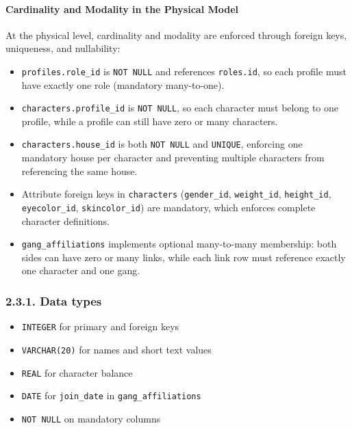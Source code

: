 \hypertarget{cardinality-and-modality-in-the-physical-model}{%
\paragraph{Cardinality and Modality in the Physical
Model}\label{cardinality-and-modality-in-the-physical-model}}

At the physical level, cardinality and modality are enforced through
foreign keys, uniqueness, and nullability:

\begin{itemize}
\tightlist
\item
  \texttt{profiles.role\_id} is \texttt{NOT\ NULL} and references
  \texttt{roles.id}, so each profile must have exactly one role
  (mandatory many-to-one).
\item
  \texttt{characters.profile\_id} is \texttt{NOT\ NULL}, so each
  character must belong to one profile, while a profile can still have
  zero or many characters.
\item
  \texttt{characters.house\_id} is both \texttt{NOT\ NULL} and
  \texttt{UNIQUE}, enforcing one mandatory house per character and
  preventing multiple characters from referencing the same house.
\item
  Attribute foreign keys in \texttt{characters} (\texttt{gender\_id},
  \texttt{weight\_id}, \texttt{height\_id}, \texttt{eyecolor\_id},
  \texttt{skincolor\_id}) are mandatory, which enforces complete
  character definitions.
\item
  \texttt{gang\_affiliations} implements optional many-to-many
  membership: both sides can have zero or many links, while each link
  row must reference exactly one character and one gang.
\end{itemize}

\hypertarget{data-types}{%
\subsubsection{2.3.1. Data types}\label{data-types}}

\begin{itemize}
\tightlist
\item
  \texttt{INTEGER} for primary and foreign keys
\item
  \texttt{VARCHAR(20)} for names and short text values
\item
  \texttt{REAL} for character balance
\item
  \texttt{DATE} for \texttt{join\_date} in \texttt{gang\_affiliations}
\item
  \texttt{NOT\ NULL} on mandatory columns
\end{itemize}

